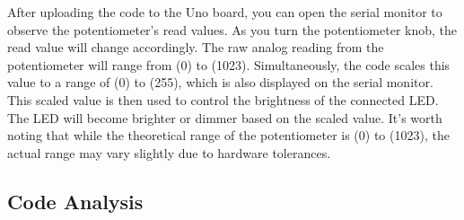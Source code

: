 \documentclass[a4paper,11pt,english]{sphinxmanual}
\begin{document}
\sphinxAtStartPar
After uploading the code to the Uno board, you can open the serial monitor to observe the potentiometer’s read values. As you turn the potentiometer knob, the read value will change accordingly. The raw analog reading from the potentiometer will range from (0) to (1023). Simultaneously, the code scales this value to a range of (0) to (255), which is also displayed on the serial monitor. This scaled value is then used to control the brightness of the connected LED. The LED will become brighter or dimmer based on the scaled value. It’s worth noting that while the theoretical range of the potentiometer is (0) to (1023), the actual range may vary slightly due to hardware tolerances.


\subsection{Code Analysis}
\end{document}
